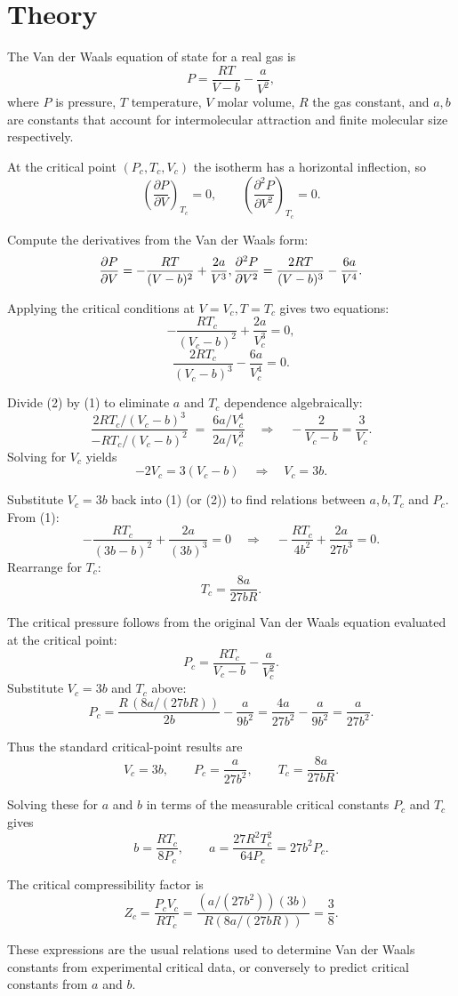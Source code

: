 \section*{Theory}
The Van der Waals equation of state for a real gas is
$$
P = \frac{RT}{V - b} - \frac{a}{V^2},
$$
where $P$ is pressure, $T$ temperature, $V$ molar volume, $R$ the gas constant, and $a,b$ are constants that account for intermolecular attraction and finite molecular size respectively.

At the critical point $(P_c,T_c,V_c)$ the isotherm has a horizontal inflection, so
$$
\left(\frac{\partial P}{\partial V}\right)_{T_c}=0,
\qquad
\left(\frac{\partial^2 P}{\partial V^2}\right)_{T_c}=0.
$$

Compute the derivatives from the Van der Waals form:
$$
\frac{\partial P}{\partial V} = -\frac{RT}{(V-b)^2} + \frac{2a}{V^3},
\\
\frac{\partial^2 P}{\partial V^2} = \frac{2RT}{(V-b)^3} - \frac{6a}{V^4}.
$$

Applying the critical conditions at $V=V_c, T=T_c$ gives two equations:
$$
 -\frac{RT_c}{(V_c-b)^2} + \frac{2a}{V_c^3} = 0,\tag{1}
$$$$
 \frac{2RT_c}{(V_c-b)^3} - \frac{6a}{V_c^4} = 0.\tag{2}
$$

Divide (2) by (1) to eliminate $a$ and $T_c$ dependence algebraically:
$$
\frac{2RT_c/(V_c-b)^3}{-RT_c/(V_c-b)^2} \;=\; \frac{6a/V_c^4}{2a/V_c^3}
\quad\Rightarrow\quad -\frac{2}{V_c-b} = \frac{3}{V_c}.
$$
Solving for $V_c$ yields
$$
-2V_c = 3(V_c-b) \quad\Rightarrow\quad V_c = 3b.
$$

Substitute $V_c=3b$ back into (1) (or (2)) to find relations between $a,b,T_c$ and $P_c$. From (1):
$$
 -\frac{RT_c}{(3b-b)^2} + \frac{2a}{(3b)^3} = 0
\quad\Rightarrow\quad -\frac{RT_c}{4b^2} + \frac{2a}{27b^3} = 0.
$$
Rearrange for $T_c$:
$$
T_c = \frac{8a}{27bR}.
$$

The critical pressure follows from the original Van der Waals equation evaluated at the critical point:
$$
P_c = \frac{R T_c}{V_c - b} - \frac{a}{V_c^2}.
$$
Substitute $V_c=3b$ and $T_c$ above:
$$
P_c = \frac{R\, (8a/(27bR))}{2b} - \frac{a}{9b^2} = \frac{4a}{27b^2} - \frac{a}{9b^2} = \frac{a}{27b^2}.
$$

Thus the standard critical-point results are
$$
V_c = 3b,\qquad P_c = \frac{a}{27b^2},\qquad T_c = \frac{8a}{27bR}.
$$

Solving these for $a$ and $b$ in terms of the measurable critical constants $P_c$ and $T_c$ gives
$$
b = \frac{R T_c}{8P_c},
\qquad
a = \frac{27R^2 T_c^2}{64P_c} = 27 b^2 P_c.
$$

The critical compressibility factor is
$$
Z_c = \frac{P_c V_c}{R T_c} = \frac{(a/(27b^2)) (3b)}{R(8a/(27bR))} = \frac{3}{8}.
$$

These expressions are the usual relations used to determine Van der Waals constants from experimental critical data, or conversely to predict critical constants from $a$ and $b$.


